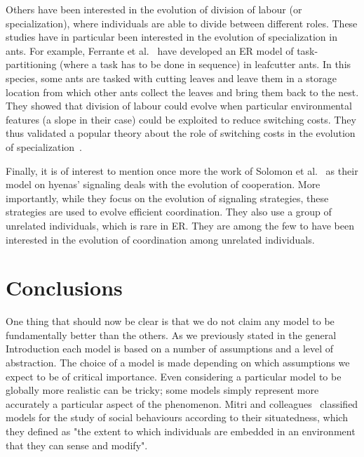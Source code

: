         Others have been interested in the evolution of division of labour (or specialization), where individuals are able to divide between different roles. These studies have in particular been interested in the evolution of specialization in ants. For example, Ferrante et al.~\parencite{Ferrante2015} have developed an ER model of task-partitioning (where a task has to be done in sequence) in leafcutter ants. In this species, some ants are tasked with cutting leaves and leave them in a storage location from which other ants collect the leaves and bring them back to the nest. They showed that division of labour could evolve when particular environmental features (a slope in their case) could be exploited to reduce switching costs. They thus validated a popular theory about the role of switching costs in the evolution of specialization~\parencite{Duarte2011}. 

        Finally, it is of interest to mention once more the work of Solomon et al.~\parencite{Solomon2012} as their model on hyenas' signaling deals with the evolution of cooperation. More importantly, while they focus on the evolution of signaling strategies, these strategies are used to evolve efficient coordination. They also use a group of unrelated individuals, which is rare in ER. They are among the few to have been interested in the evolution of coordination among unrelated individuals. 


\section{Conclusions}

    One thing that should now be clear is that we do not claim any model to be fundamentally better than the others. As we previously stated in the general Introduction each model is based on a number of assumptions and a level of abstraction. The choice of a model is made depending on which assumptions we expect to be of critical importance. Even considering a particular model to be globally more realistic can be tricky; some models simply represent more accurately a particular aspect of the phenomenon. Mitri and colleagues~\parencite{Mitri2012} classified models for the study of social behaviours according to their situatedness, which they defined as "the extent to which individuals are embedded in an environment that they can sense and modify".

